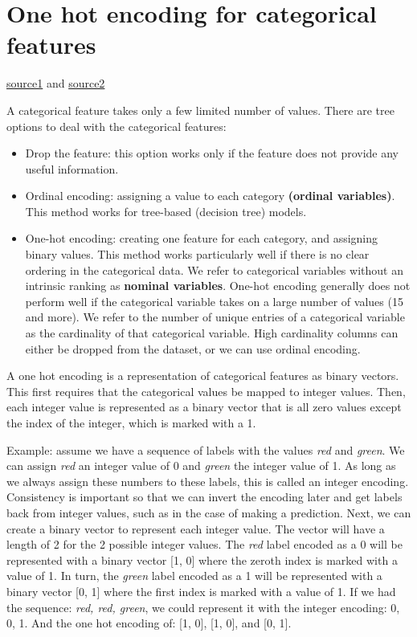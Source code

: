 \documentclass[12pt]{report}
\begin{document}
\section{One hot encoding for categorical features}
\label{sec:one-hot}

\href{https://www.youtube.com/watch?v=v_4KWmkwmsU&ab_channel=deeplizard}{source1} and \href{https://machinelearningmastery.com/how-to-one-hot-encode-sequence-data-in-python/}{source2}

A categorical feature takes only a few limited number of values. There are tree options to deal with the categorical features:
\begin{itemize}
  \item Drop the feature: this option works only if the feature does not provide any useful information.
  \item Ordinal encoding: assigning a value to each category \textbf{(ordinal variables)}. This method works for tree-based (decision tree) models.
  \item One-hot encoding: creating one feature for each category, and assigning binary values. This method works particularly well if there is no clear ordering in the categorical data. We refer to categorical variables without an intrinsic ranking as \textbf{nominal variables}. One-hot encoding generally does not perform well if the categorical variable takes on a large number of values (15 and more). We refer to the number of unique entries of a categorical variable as the cardinality of that categorical variable. High cardinality columns can either be dropped from the dataset, or we can use ordinal encoding.
\end{itemize}

A one hot encoding is a representation of categorical features as binary vectors. This first requires that the categorical values be mapped to integer values. Then, each integer value is represented as a binary vector that is all zero values except the index of the integer, which is marked with a 1.

Example: assume we have a sequence of labels with the values \textit{red} and \textit{green}. We can assign \textit{red} an integer value of 0 and \textit{green} the integer value of 1. As long as we always assign these numbers to these labels, this is called an integer encoding. Consistency is important so that we can invert the encoding later and get labels back from integer values, such as in the case of making a prediction. Next, we can create a binary vector to represent each integer value. The vector will have a length of 2 for the 2 possible integer values. The \textit{red} label encoded as a 0 will be represented with a binary vector [1, 0] where the zeroth index is marked with a value of 1. In turn, the \textit{green} label encoded as a 1 will be represented with a binary vector [0, 1] where the first index is marked with a value of 1. If we had the sequence: \textit{red, red, green}, we could represent it with the integer encoding: 0, 0, 1. And the one hot encoding of:
[1, 0], [1, 0], and [0, 1].
\end{document}
